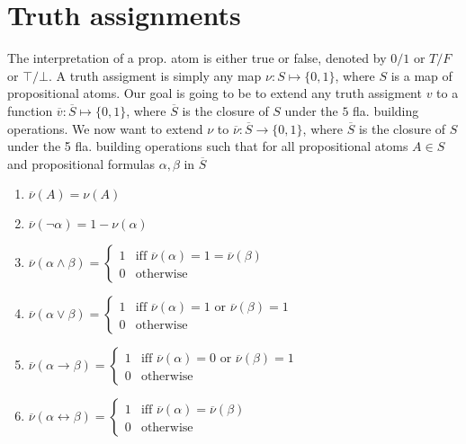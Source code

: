 \section{Truth assignments}
The interpretation of a prop. atom is either true or false, denoted by $0 / 1$ or $T / F$ or $\top / \bot$. 
A truth assigment is simply any map $\nu:S\mapsto \{0,1\}$, where $S$ is a map of propositional atoms. 
Our goal is going to be to extend any truth assigment $v$ to a function $\overline{v}: \overline{S}\mapsto \{0,1\}$, where $\overline{S}$ is the closure
of $S$ under the $5$ fla. building operations. 
We now want to extend $\nu$ to $\overline{\nu}: \overline{S}\to \{0,1\}$, where $\overline{S}$ is the closure of $S$ under the 5 fla. building operations such that
for all propositional atoms $A\in S$ and propositional formulas $\alpha,\beta$ in $\overline{S}$
\begin{enumerate}
    \item $\overline{\nu}(A) = \nu(A)$ 
    \item $\overline{\nu}(\lnot \alpha) = 1- \nu(\alpha)$ 
    \item $\overline{\nu}(\alpha \land \beta) = \begin{cases}
        1 & \text{iff } \overline{\nu}(\alpha) = 1 = \overline{\nu}(\beta)\\
        0 & \text{otherwise}
    \end{cases}$
    \item $\overline{\nu}(\alpha \lor \beta) = \begin{cases}
        1 & \text{iff } \overline{\nu}(\alpha) = 1 \text{ or } \overline{\nu}(\beta) = 1\\
        0 & \text{otherwise}
    \end{cases}$
    \item $\overline{\nu}(\alpha \to \beta) = \begin{cases}
        1 & \text{iff } \overline{\nu}(\alpha) = 0 \text{ or } \overline{\nu}(\beta) = 1\\
        0 & \text{otherwise}
    \end{cases}$
    \item $\overline{\nu}(\alpha \leftrightarrow \beta) = \begin{cases}
        1 & \text{iff } \overline{\nu}(\alpha) =  \overline{\nu}(\beta)\\
        0 & \text{otherwise}
    \end{cases}$
\end{enumerate}
